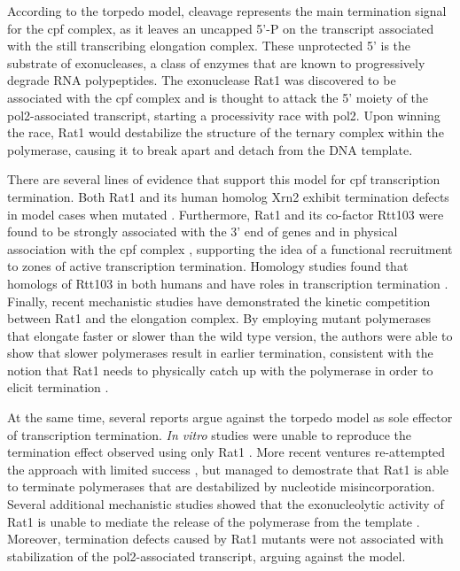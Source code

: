 According to the torpedo model, cleavage represents the main termination signal for the \gls{cpf} complex, as it leaves an uncapped 5'-P on the transcript associated with the still transcribing elongation complex.
These unprotected 5' is the substrate of \FtoT{} exonucleases, a class of enzymes that are known to progressively degrade RNA polypeptides.
The \FtoT{} exonuclease Rat1 was discovered to be associated with the \gls{cpf} complex and is thought to attack the 5' moiety of the \gls{pol2}-associated transcript, starting a processivity race with \gls{pol2}.
Upon winning the race, Rat1 would destabilize the structure of the ternary complex within the polymerase, causing it to break apart and detach from the DNA template.

There are several lines of evidence that support this model for \gls{cpf} transcription termination.
Both Rat1 and its human homolog Xrn2 exhibit termination defects in model cases when mutated \citep{kim:2004:yeast, west:2004:human}.
Furthermore, Rat1 and its co-factor Rtt103 were found to be strongly associated with the 3' end of genes and in physical association with the \gls{cpf} complex \citep{kim:2004:yeast,luo:2006:role}, supporting the idea of a functional recruitment to zones of active transcription termination.
Homology studies found that homologs of Rtt103 in both humans and \cele{} have roles in transcription termination \citep{morales:2014:kub5hera, cui:2008:genes}.
Finally, recent mechanistic studies \invivo{} have demonstrated the kinetic competition between Rat1 and the elongation complex. By employing mutant polymerases that elongate faster or slower than the wild type version, the authors were able to show that slower polymerases result in earlier termination, consistent with the notion that Rat1 needs to physically catch up with the polymerase in order to elicit termination \citep{fong:2015:effects}.

At the same time, several reports argue against the torpedo model as sole effector of transcription termination.
\emph{In vitro} studies were unable to reproduce the termination effect observed \invivo{} using only Rat1  \citep{dengl:2009:torpedo}. More recent ventures re-attempted the \invitro{} approach with limited success  \citep{park:2015:unraveling}, but managed to demostrate that Rat1 is able to terminate polymerases that are destabilized by nucleotide misincorporation.
Several additional mechanistic studies showed that the exonucleolytic activity of Rat1 is unable to mediate the release of the polymerase from the template \citep{luo:2006:role, pearson:2013:dismantling}.
Moreover, termination defects caused by Rat1 mutants were not associated with stabilization of the \gls{pol2}-associated transcript, arguing against the model.


